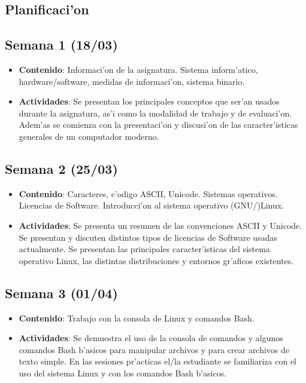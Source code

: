 \documentclass[letterpaper,11pt]{exam}
\begin{document}
\begin{multicols}{2}
\newpage
\section{Planificaci'on}
\begin{scriptsize}

\subsection*{Semana 1 (18/03)}
\begin{itemize}
\item \textbf{Contenido}: Informaci'on de la asignatura. Sistema inform'atico, hardware/software, medidas de informaci'on, sistema binario.
\item \textbf{Actividades}: Se presentan los principales conceptos que ser'an usados durante la asignatura, as'i como la modalidad de trabajo y de evaluaci'on. Adem'as se comienza con la presentaci'on y discusi'on de las caracter'isticas generales de un computador moderno.
\end{itemize}

\subsection*{Semana 2 (25/03)}
\begin{itemize}
\item \textbf{Contenido}: Caracteres, c'odigo ASCII, Unicode. Sistemas operativos. Licencias de Software. Introducci'on al sistema operativo (GNU/)Linux. 
\item \textbf{Actividades}: Se presenta un resumen de las convenciones ASCII y Unicode. Se presentan y discuten distintos tipos de licencias de Software usadas actualmente. Se presentan las principales caracter'isticas del sistema operativo Linux, las distintas distribuciones y entornos gr'aficos existentes. 
\end{itemize}

\subsection*{Semana 3 (01/04)}
\begin{itemize}
\item \textbf{Contenido}: Trabajo con la consola de Linux y comandos Bash. 
\item \textbf{Actividades}: Se demuestra el uso de la consola de comandos y algunos comandos Bash b'asicos para manipular archivos y para crear archivos de texto simple. En las sesiones pr'acticas el/la estudiante se familiariza con el uso del sistema Linux y con los comandos Bash b'asicos.
\end{itemize}


\end{scriptsize}
\end{multicols}
\end{document}
